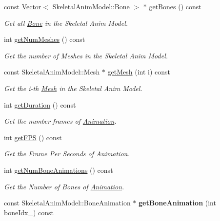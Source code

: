 \begin{DoxyCompactItemize}
const \hyperlink{class_magnum_1_1_vector}{Vector}$<$ Skeletal\+Anim\+Model\+::\+Bone $>$ $\ast$ \hyperlink{class_magnum_1_1endif_ab234bdd9141370fdd3cd18f3a1c0303b}{get\+Bones} () const 
\begin{DoxyCompactList}\small\item\em Get all \hyperlink{class_magnum_1_1endif_1_1_bone}{Bone} in the Skeletal Anim Model. \end{DoxyCompactList}\item 
int \hyperlink{class_magnum_1_1endif_acbb0043ea64044fca0fc186e83793054}{get\+Num\+Meshes} () const 
\begin{DoxyCompactList}\small\item\em Get the number of Meshes in the Skeletal Anim Model. \end{DoxyCompactList}\item 
const Skeletal\+Anim\+Model\+::\+Mesh $\ast$ \hyperlink{class_magnum_1_1endif_ae71a00c05373bfc9b1e508bff4008b48}{get\+Mesh} (int i) const 
\begin{DoxyCompactList}\small\item\em Get the i-\/th \hyperlink{class_magnum_1_1endif_1_1_mesh}{Mesh} in the Skeletal Anim Model. \end{DoxyCompactList}\item 
int \hyperlink{class_magnum_1_1endif_aca1d5b1a717d7e86cafdae78a8ac87c8}{get\+Duration} () const 
\begin{DoxyCompactList}\small\item\em Get the number frames of \hyperlink{class_magnum_1_1endif_1_1_animation}{Animation}. \end{DoxyCompactList}\item 
int \hyperlink{class_magnum_1_1endif_a4a22019c6baf0297e3d6152242c6e4fb}{get\+F\+PS} () const 
\begin{DoxyCompactList}\small\item\em Get the Frame Per Seconds of \hyperlink{class_magnum_1_1endif_1_1_animation}{Animation}. \end{DoxyCompactList}\item 
int \hyperlink{class_magnum_1_1endif_ae5b331561f7adcbf6d41ab419cb43307}{get\+Num\+Bone\+Animations} () const 
\begin{DoxyCompactList}\small\item\em Get the Number of Bones of \hyperlink{class_magnum_1_1endif_1_1_animation}{Animation}. \end{DoxyCompactList}\item 
const Skeletal\+Anim\+Model\+::\+Bone\+Animation $\ast$ {\bfseries get\+Bone\+Animation} (int bone\+Idx\+\_\+) const \hypertarget{class_magnum_1_1endif_a257ca4fb5cdf623e6085905875cc3ba7}{}\label{class_magnum_1_1endif_a257ca4fb5cdf623e6085905875cc3ba7}


\end{DoxyCompactItemize}
